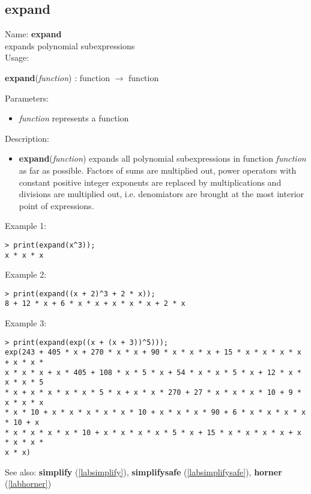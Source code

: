 \subsection{expand}
\label{labexpand}
\noindent Name: \textbf{expand}\\
expands polynomial subexpressions\\
\noindent Usage: 
\begin{center}
\textbf{expand}(\emph{function}) : \textsf{function} $\rightarrow$ \textsf{function}\\
\end{center}
Parameters: 
\begin{itemize}
\item \emph{function} represents a function
\end{itemize}
\noindent Description: \begin{itemize}

\item \textbf{expand}(\emph{function}) expands all polynomial subexpressions in function
   \emph{function} as far as possible. Factors of sums are multiplied out,
   power operators with constant positive integer exponents are replaced
   by multiplications and divisions are multiplied out, i.e. denomiators
   are brought at the most interior point of expressions.
\end{itemize}
\noindent Example 1: 
\begin{center}\begin{minipage}{15cm}\begin{Verbatim}[frame=single]
> print(expand(x^3));
x * x * x
\end{Verbatim}
\end{minipage}\end{center}
\noindent Example 2: 
\begin{center}\begin{minipage}{15cm}\begin{Verbatim}[frame=single]
> print(expand((x + 2)^3 + 2 * x));
8 + 12 * x + 6 * x * x + x * x * x + 2 * x
\end{Verbatim}
\end{minipage}\end{center}
\noindent Example 3: 
\begin{center}\begin{minipage}{15cm}\begin{Verbatim}[frame=single]
> print(expand(exp((x + (x + 3))^5)));
exp(243 + 405 * x + 270 * x * x + 90 * x * x * x + 15 * x * x * x * x + x * x * 
x * x * x + x * 405 + 108 * x * 5 * x + 54 * x * x * 5 * x + 12 * x * x * x * 5 
* x + x * x * x * x * 5 * x + x * x * 270 + 27 * x * x * x * 10 + 9 * x * x * x 
* x * 10 + x * x * x * x * x * 10 + x * x * x * 90 + 6 * x * x * x * x * 10 + x 
* x * x * x * x * 10 + x * x * x * x * 5 * x + 15 * x * x * x * x + x * x * x * 
x * x)
\end{Verbatim}
\end{minipage}\end{center}
See also: \textbf{simplify} (\ref{labsimplify}), \textbf{simplifysafe} (\ref{labsimplifysafe}), \textbf{horner} (\ref{labhorner})
